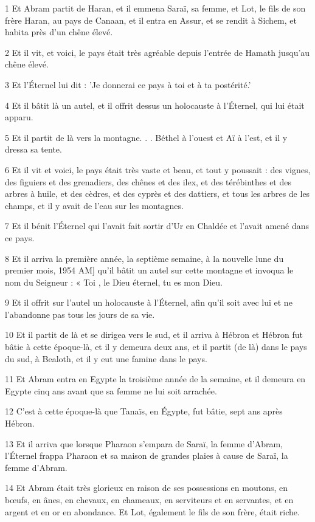 \par 1 Et Abram partit de Haran, et il emmena Saraï, sa femme, et Lot, le fils de son frère Haran, au pays de Canaan, et il entra en Assur, et se rendit à Sichem, et habita près d'un chêne élevé.
\par 2 Et il vit, et voici, le pays était très agréable depuis l'entrée de Hamath jusqu'au chêne élevé.
\par 3 Et l'Éternel lui dit : 'Je donnerai ce pays à toi et à ta postérité.'
\par 4 Et il bâtit là un autel, et il offrit dessus un holocauste à l'Éternel, qui lui était apparu.
\par 5 Et il partit de là vers la montagne. . . Béthel à l'ouest et Aï à l'est, et il y dressa sa tente.
\par 6 Et il vit et voici, le pays était très vaste et beau, et tout y poussait : des vignes, des figuiers et des grenadiers, des chênes et des ilex, et des térébinthes et des arbres à huile, et des cèdres, et des cyprès et des dattiers, et tous les arbres de les champs, et il y avait de l'eau sur les montagnes.
\par 7 Et il bénit l'Éternel qui l'avait fait sortir d'Ur en Chaldée et l'avait amené dans ce pays.
\par 8 Et il arriva la première année, la septième semaine, à la nouvelle lune du premier mois, 1954 AM] qu'il bâtit un autel sur cette montagne et invoqua le nom du Seigneur : « Toi , le Dieu éternel, tu es mon Dieu.
\par 9 Et il offrit sur l'autel un holocauste à l'Éternel, afin qu'il soit avec lui et ne l'abandonne pas tous les jours de sa vie.
\par 10 Et il partit de là et se dirigea vers le sud, et il arriva à Hébron et Hébron fut bâtie à cette époque-là, et il y demeura deux ans, et il partit (de là) dans le pays du sud, à Bealoth, et il y eut une famine dans le pays.
\par 11 Et Abram entra en Egypte la troisième année de la semaine, et il demeura en Egypte cinq ans avant que sa femme ne lui soit arrachée.
\par 12 C'est à cette époque-là que Tanaïs, en Égypte, fut bâtie, sept ans après Hébron.
\par 13 Et il arriva que lorsque Pharaon s'empara de Saraï, la femme d'Abram, l'Éternel frappa Pharaon et sa maison de grandes plaies à cause de Saraï, la femme d'Abram.
\par 14 Et Abram était très glorieux en raison de ses possessions en moutons, en bœufs, en ânes, en chevaux, en chameaux, en serviteurs et en servantes, et en argent et en or en abondance. Et Lot, également le fils de son frère, était riche.
